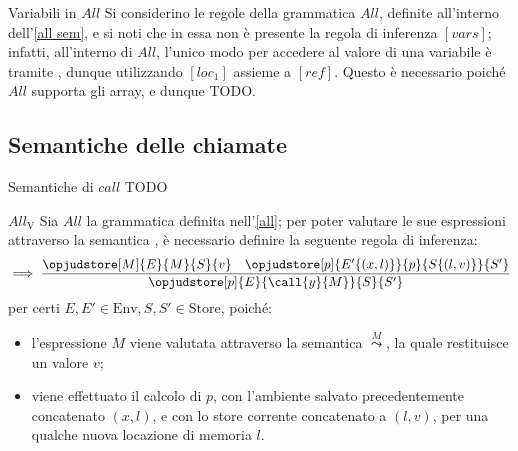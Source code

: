 \documentclass[a4paper, 12pt]{report}
\begin{document}
    \begin{framedobs}{Variabili in $All$}
        Si considerino le regole della grammatica $All$, definite all'interno dell'\cref{all sem}, e si noti che in essa non è presente la regola di inferenza $[vars]$; infatti, all'interno di $All$, l'unico modo per accedere al valore di una variabile è tramite , dunque utilizzando $[loc_1]$ assieme a $[ref]$. Questo è necessario poiché $All$ supporta gli array, e dunque TODO.
    \end{framedobs}

    \subsection{Semantiche delle chiamate}

    \begin{frameddefn}{Semantiche di $call$}
        TODO
    \end{frameddefn}

    \begin{framedobs}[label={all v}]{$All_\mathrm{V}$}
        Sia $All$ la grammatica definita nell'\cref{all}; per poter valutare le sue espressioni attraverso la semantica , è necessario definire la seguente regola di inferenza:  $$\implies \dfrac{\opjudstore[M]{E}{M}{S}{v} \quad \opjudstore[p]{E'\{(x,l)\}}{p}{S\{(l,v)\}}{S'}}{\opjudstore[p]{E}{\call{y}{M}}{S}{S'}}$$ per certi $E, E' \in \mathrm{Env}, S,S' \in \mathrm{Store}$, poiché:

        \begin{itemize}
            \item l'espressione $M$ viene valutata attraverso la semantica $\stackrel{M}{\leadsto}$, la quale restituisce un valore $v$;
            \item viene effettuato il calcolo di $p$, con l'ambiente salvato precedentemente concatenato $(x,l)$, e con lo store corrente concatenato a $(l,v)$, per una qualche nuova locazione di memoria $l$.
        \end{itemize}
    \end{framedobs}
\end{document}
